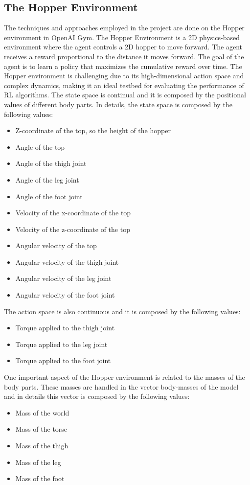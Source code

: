 \documentclass[12pt]{article}
\begin{document}
\subsection{The Hopper Environment}
The techniques and approaches employed in the project are done on the Hopper environment in OpenAI Gym. 
The Hopper Environment is a 2D physics-based environment where the agent controls a 2D hopper to move forward. The agent receives a reward proportional to the distance it moves forward. The goal of the agent is to learn a policy that maximizes the cumulative reward over time. The Hopper environment is challenging due to its high-dimensional action space and complex dynamics, making it an ideal testbed for evaluating the performance of RL algorithms. 
The state space is continual and it is composed by the positional values of different body parts. In details, the state space is composed by the following values:
\begin{itemize}
    \item Z-coordinate of the top, so the height of the hopper
    \item Angle of the top
    \item Angle of the thigh joint
    \item Angle of the leg joint
    \item Angle of the foot joint
    \item Velocity of the x-coordinate of the top
    \item Velocity of the z-coordinate of the top
    \item Angular velocity of the top
    \item Angular velocity of the thigh joint
    \item Angular velocity of the leg joint
    \item Angular velocity of the foot joint
\end{itemize}

The action space is also continuous and it is composed by the following values:
\begin{itemize}
    \item Torque applied to the thigh joint
    \item Torque applied to the leg joint
    \item Torque applied to the foot joint
\end{itemize}

One important aspect of the Hopper environment is related to the masses of the body parts. These masses are handled in the vector body-masses of the model and in details this vector is composed by the following values:
\begin{itemize}
    \item Mass of the world
    \item Mass of the torse
    \item Mass of the thigh
    \item Mass of the leg
    \item Mass of the foot
\end{itemize}
\end{document}

